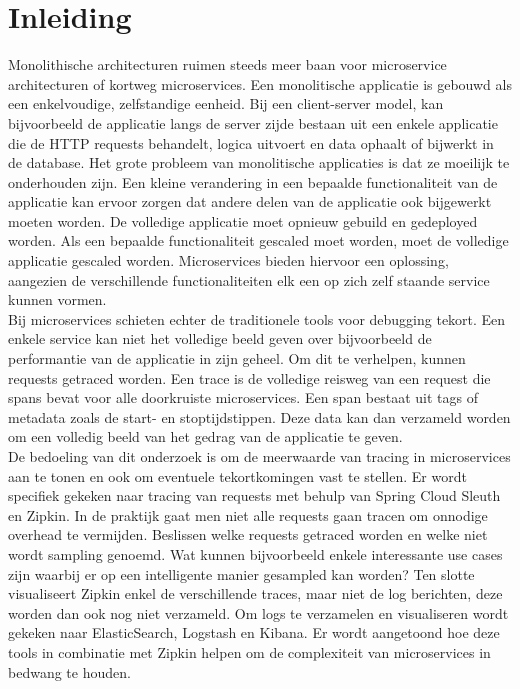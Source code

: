 
\chapter{Inleiding}
\label{ch:inleiding}

Monolithische architecturen ruimen steeds meer baan voor microservice architecturen of kortweg microservices. Een monolitische applicatie is gebouwd als een enkelvoudige, zelfstandige eenheid. Bij een client-server model, kan bijvoorbeeld de applicatie langs de server zijde bestaan uit een enkele applicatie die de HTTP requests behandelt, logica uitvoert en data ophaalt of bijwerkt in de database. Het grote probleem van monolitische applicaties is dat ze moeilijk te onderhouden zijn. Een kleine verandering in een bepaalde functionaliteit van de applicatie kan ervoor zorgen dat andere delen van de applicatie ook bijgewerkt moeten worden. De volledige applicatie moet opnieuw gebuild en gedeployed worden. Als een bepaalde functionaliteit gescaled moet worden, moet de volledige applicatie gescaled worden. Microservices bieden hiervoor een oplossing, aangezien de verschillende functionaliteiten elk een op zich zelf staande service kunnen vormen. \\

Bij microservices schieten echter de traditionele tools voor debugging tekort. Een enkele service kan niet het volledige beeld geven over bijvoorbeeld de performantie van de applicatie in zijn geheel. Om dit te verhelpen, kunnen requests getraced worden. Een trace is de volledige reisweg van een request die spans bevat voor alle doorkruiste microservices. Een span bestaat uit tags of metadata zoals de start- en stoptijdstippen. Deze data kan dan verzameld worden om een volledig beeld van het gedrag van de applicatie te geven. \\

De bedoeling van dit onderzoek is om de meerwaarde van tracing in microservices aan te tonen en ook om eventuele tekortkomingen vast te stellen. Er wordt specifiek gekeken naar tracing van requests met behulp van Spring Cloud Sleuth en Zipkin. In de praktijk gaat men niet alle requests gaan tracen om onnodige overhead te vermijden. Beslissen welke requests getraced worden en welke niet wordt sampling genoemd. Wat kunnen bijvoorbeeld enkele interessante use cases zijn waarbij er op een intelligente manier gesampled kan worden? Ten slotte visualiseert Zipkin enkel de verschillende traces, maar niet de log berichten, deze worden dan ook nog niet verzameld. Om logs te verzamelen en visualiseren wordt gekeken naar ElasticSearch, Logstash en Kibana. Er wordt aangetoond hoe deze tools in combinatie met Zipkin helpen om de complexiteit van microservices in bedwang te houden.  \\

